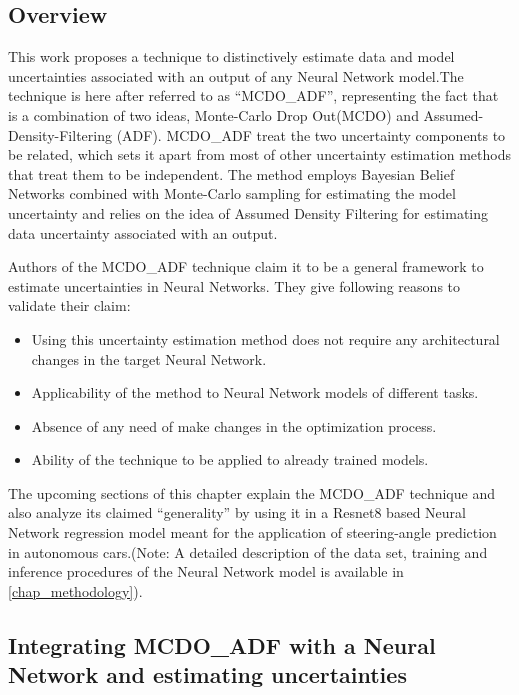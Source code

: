 	\subsection{Overview}\label{mcdo_adf_overview}
	This work proposes a technique to distinctively estimate data and model uncertainties associated with an output of any Neural Network model.The technique is here after referred to as \enquote{MCDO\_ADF}, representing the fact that is a combination of two ideas, Monte-Carlo Drop Out(MCDO) and Assumed-Density-Filtering (ADF). MCDO\_ADF treat the  two uncertainty components to be related, which sets it apart from most of other uncertainty estimation methods that treat them to be independent. The method employs Bayesian Belief Networks combined with Monte-Carlo sampling for estimating the model uncertainty and relies on the idea of Assumed Density Filtering for  estimating data uncertainty associated with an output. 
	
	Authors of the MCDO\_ADF technique claim it to be a general framework to estimate uncertainties in Neural Networks. They give following reasons to validate their claim:
	\begin{itemize}
		\item Using this uncertainty estimation method does not require any architectural changes in the target Neural Network.
		\item Applicability of the method to Neural Network models of different tasks.
		\item Absence of any need of make changes in the optimization process.
		\item Ability of the technique to be applied to already trained models.
	\end{itemize}
	
	The upcoming sections of this chapter explain the MCDO\_ADF technique  and also analyze its claimed \enquote{generality} by using it in a Resnet8 based Neural Network regression model meant for the application of steering-angle prediction in autonomous cars.(Note: A detailed description of the data set, training and inference procedures of the Neural Network model is available in \ref{chap_methodology}).  
	
	
	\subsection{Integrating MCDO\_ADF with a Neural Network and estimating uncertainties}
